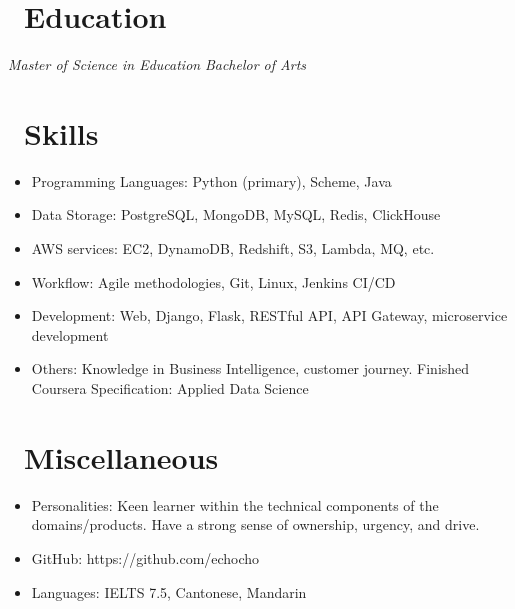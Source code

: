 \documentclass{resume}
\begin{document}
\section{\faGraduationCap\ Education}
\textit{Master of Science in Education}
\textit{Bachelor of Arts}

\section{\faCogs\ Skills}
\begin{itemize}[parsep=0.5ex]
  \item Programming Languages: Python (primary), Scheme, Java
  \item Data Storage: PostgreSQL, MongoDB, MySQL, Redis, ClickHouse
  \item AWS services: EC2, DynamoDB, Redshift, S3, Lambda, MQ, etc.
  \item Workflow: Agile methodologies, Git, Linux, Jenkins CI/CD
  \item Development: Web, Django, Flask, RESTful API, API Gateway, microservice development
  \item Others: Knowledge in Business Intelligence, customer journey. Finished Coursera Specification: Applied Data Science
\end{itemize}

\section{\faInfo\ Miscellaneous}
\begin{itemize}[parsep=0.5ex]
  \item Personalities: Keen learner within the technical components of the domains/products. Have a strong sense of ownership, urgency, and drive.
  \item GitHub: https://github.com/echocho
  \item Languages: IELTS 7.5, Cantonese, Mandarin
\end{itemize}

%
%
\end{document}
